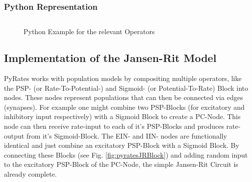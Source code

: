 \subsubsection{Python Representation}

\begin{figure}[H]
	\inputminted[mathescape, frame=lines, linenos, fontsize=\footnotesize, baselinestretch=1.2, bgcolor=LightGray, tabsize=4]
	{python3}{Chapters/Chapter_02_Technical_Concepts/code/python_example.py}

	\caption{Python Example for the relevant Operators}
\end{figure}

\subsection{Implementation of the Jansen-Rit Model}
PyRates works with population models by compositing multiple operators, like the PSP- (or Rate-To-Potential-) and Sigmoid- (or Potential-To-Rate) Block into nodes. These nodes represent populations that can then be connected via edges (synapses). For example one might combine two PSP-Blocks (for excitatory and inhibitory input respectively) with a Sigmoid Block to create a PC-Node. This node can then receive rate-input to each of it's PSP-Blocks and  produces rate-output from it's Sigmoid-Block. The EIN- and IIN- nodes are functionally identical and just combine an excitatory PSP-Block with a Sigmoid Block. By connecting these Blocks (see Fig. \ref{fig:pyratesJRBlock}) and adding random input to the excitatory PSP-Block of the PC-Node, the simple Jansen-Rit Circuit is already complete.
